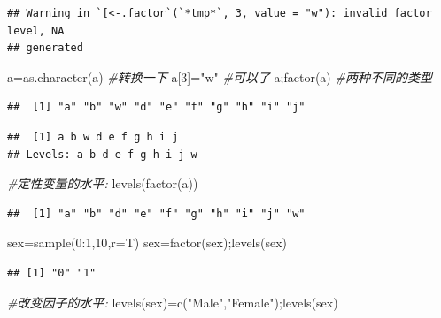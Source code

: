 \documentclass[
]{book}
\newenvironment{Shaded}{\begin{snugshade}}{\end{snugshade}}
\newcommand{\AttributeTok}[1]{\textcolor[rgb]{0.77,0.63,0.00}{#1}}
\newcommand{\CommentTok}[1]{\textcolor[rgb]{0.56,0.35,0.01}{\textit{#1}}}
\newcommand{\DecValTok}[1]{\textcolor[rgb]{0.00,0.00,0.81}{#1}}
\newcommand{\FunctionTok}[1]{\textcolor[rgb]{0.00,0.00,0.00}{#1}}
\newcommand{\NormalTok}[1]{#1}
\newcommand{\OtherTok}[1]{\textcolor[rgb]{0.56,0.35,0.01}{#1}}
\newcommand{\SpecialCharTok}[1]{\textcolor[rgb]{0.00,0.00,0.00}{#1}}
\newcommand{\StringTok}[1]{\textcolor[rgb]{0.31,0.60,0.02}{#1}}
\begin{document}
\begin{verbatim}
## Warning in `[<-.factor`(`*tmp*`, 3, value = "w"): invalid factor level, NA
## generated
\end{verbatim}

\begin{Shaded}
\begin{Highlighting}[]
\NormalTok{a}\OtherTok{=}\FunctionTok{as.character}\NormalTok{(a) }\CommentTok{\#转换一下}
\NormalTok{a[}\DecValTok{3}\NormalTok{]}\OtherTok{=}\StringTok{"w"} \CommentTok{\#可以了}
\NormalTok{a;}\FunctionTok{factor}\NormalTok{(a) }\CommentTok{\#两种不同的类型}
\end{Highlighting}
\end{Shaded}

\begin{verbatim}
##  [1] "a" "b" "w" "d" "e" "f" "g" "h" "i" "j"
\end{verbatim}

\begin{verbatim}
##  [1] a b w d e f g h i j
## Levels: a b d e f g h i j w
\end{verbatim}

\begin{Shaded}
\begin{Highlighting}[]
\CommentTok{\#定性变量的水平:}
\FunctionTok{levels}\NormalTok{(}\FunctionTok{factor}\NormalTok{(a))}
\end{Highlighting}
\end{Shaded}

\begin{verbatim}
##  [1] "a" "b" "d" "e" "f" "g" "h" "i" "j" "w"
\end{verbatim}

\begin{Shaded}
\begin{Highlighting}[]
\NormalTok{sex}\OtherTok{=}\FunctionTok{sample}\NormalTok{(}\DecValTok{0}\SpecialCharTok{:}\DecValTok{1}\NormalTok{,}\DecValTok{10}\NormalTok{,}\AttributeTok{r=}\NormalTok{T)}
\NormalTok{sex}\OtherTok{=}\FunctionTok{factor}\NormalTok{(sex);}\FunctionTok{levels}\NormalTok{(sex)}
\end{Highlighting}
\end{Shaded}

\begin{verbatim}
## [1] "0" "1"
\end{verbatim}

\begin{Shaded}
\begin{Highlighting}[]
\CommentTok{\#改变因子的水平:}
\FunctionTok{levels}\NormalTok{(sex)}\OtherTok{=}\FunctionTok{c}\NormalTok{(}\StringTok{"Male"}\NormalTok{,}\StringTok{"Female"}\NormalTok{);}\FunctionTok{levels}\NormalTok{(sex)}
\end{Highlighting}
\end{Shaded}
\end{document}
